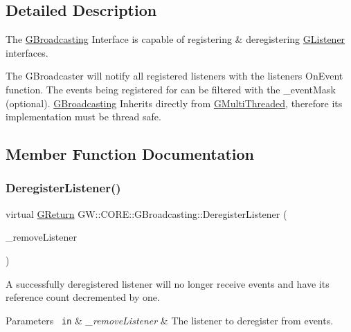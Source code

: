 \subsection{Detailed Description}
The \mbox{\hyperlink{classGW_1_1CORE_1_1GBroadcasting}{G\+Broadcasting}} Interface is capable of registering \& deregistering \mbox{\hyperlink{classGW_1_1CORE_1_1GListener}{G\+Listener}} interfaces. 

The G\+Broadcaster will notify all registered listeners with the listeners On\+Event function. The events being registered for can be filtered with the \+\_\+event\+Mask (optional). \mbox{\hyperlink{classGW_1_1CORE_1_1GBroadcasting}{G\+Broadcasting}} Inherits directly from \mbox{\hyperlink{classGW_1_1CORE_1_1GMultiThreaded}{G\+Multi\+Threaded}}, therefore its implementation must be thread safe. 

\subsection{Member Function Documentation}
\mbox{\label{classGW_1_1CORE_1_1GBroadcasting_afd6b1f41b646c668b1fcce2580681dd5}} 
\subsubsection{\texorpdfstring{DeregisterListener()}{DeregisterListener()}}
{\footnotesize\ttfamily virtual \mbox{\hyperlink{namespaceGW_a67a839e3df7ea8a5c5686613a7a3de21}{G\+Return}} G\+W\+::\+C\+O\+R\+E\+::\+G\+Broadcasting\+::\+Deregister\+Listener (\begin{DoxyParamCaption}\item[{\mbox{\hyperlink{classGW_1_1CORE_1_1GListener}{G\+Listener}} $\ast$}]{\+\_\+remove\+Listener }\end{DoxyParamCaption})\hspace{0.3cm}{\ttfamily [pure virtual]}}



A successfully deregistered listener will no longer receive events and have its reference count decremented by one. 


\begin{DoxyParams}[1]{Parameters}
\mbox{\texttt{ in}}  & {\em \+\_\+remove\+Listener} & The listener to deregister from events.\\
\hline
\end{DoxyParams}

